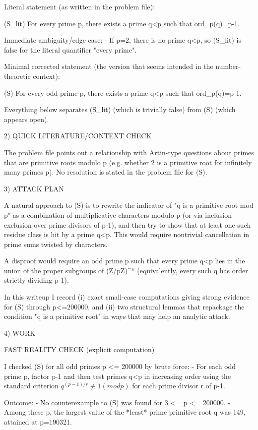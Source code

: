 Literal statement (as written in the problem file):

  (S_lit)  For every prime p, there exists a prime q<p such that ord_p(q)=p-1.

Immediate ambiguity/edge case:
- If p=2, there is no prime q<p, so (S_lit) is false for the literal quantifier "every prime".

Minimal corrected statement (the version that seems intended in the number-theoretic context):

  (S)  For every odd prime p, there exists a prime q<p such that ord_p(q)=p-1.

Everything below separates (S_lit) (which is trivially false) from (S) (which appears open).

2) QUICK LITERATURE/CONTEXT CHECK

The problem file points out a relationship with Artin-type questions about primes that are
primitive roots modulo p (e.g. whether 2 is a primitive root for infinitely many primes p).
No resolution is stated in the problem file for (S).

3) ATTACK PLAN

A natural approach to (S) is to rewrite the indicator of "q is a primitive root mod p" as a
combination of multiplicative characters modulo p (or via inclusion-exclusion over prime
divisors of p-1), and then try to show that at least one such residue class is hit by a prime
q<p. This would require nontrivial cancellation in prime sums twisted by characters.

A disproof would require an odd prime p such that every prime q<p lies in the union of the
proper subgroups of (Z/pZ)^* (equivalently, every such q has order strictly dividing p-1).

In this writeup I record (i) exact small-case computations giving strong evidence for (S)
through p<=200000, and (ii) two structural lemmas that repackage the condition "q is a
primitive root" in ways that may help an analytic attack.

4) WORK

FAST REALITY CHECK (explicit computation)

I checked (S) for all odd primes p <= 200000 by brute force:
- For each odd prime p, factor p-1 and then test primes q<p in increasing order using the
  standard criterion \(q^{(p-1)/r} \not\equiv 1 (mod p)\) for each prime divisor r of p-1.

Outcome:
- No counterexample to (S) was found for 3 <= p <= 200000.
- Among these p, the largest value of the *least* prime primitive root q was 149, attained at
  p=190321.

